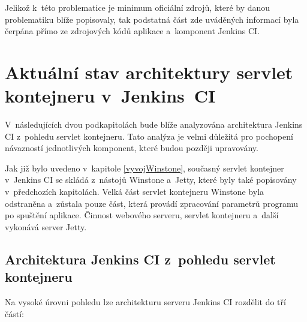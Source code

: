     Jelikož k~této problematice je minimum oficiální zdrojů, které by danou problematiku blíže popisovaly, 
    tak podstatná část zde uváděných informací byla čerpána přímo ze zdrojových kódů aplikace a~komponent Jenkins CI.
    
    \section{Aktuální stav architektury servlet kontejneru v~Jenkins~CI}\label{secArchitecture}
        V~následujících dvou podkapitolách bude blíže analyzována architektura
        Jenkins CI z~pohledu servlet kontejneru. Tato analýza je velmi důležitá
        pro pochopení návazností jednotlivých komponent, které budou později upravovány.

        Jak již bylo uvedeno v~kapitole \ref{vyvojWinstone}, současný servlet kontejner 
        v~Jenkins CI se skládá z~nástojů Winstone a~Jetty, které byly také popisovány
        v~předchozích kapitolách. Velká část servlet
        kontejneru Winstone byla odstraněna a~zůstala pouze část, která
        provádí zpracování parametrů
        programu po spuštění aplikace. Činnost webového serveru, servlet kontejneru
        a~další vykonává server Jetty.
        

        \subsection{Architektura Jenkins CI z~pohledu servlet kontejneru} 
            Na vysoké úrovni pohledu lze architekturu serveru Jenkins CI rozdělit do tří částí:
            

